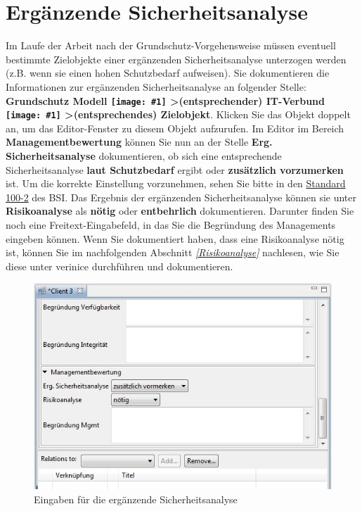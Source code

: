 \documentclass[a4paper,10pt]{book}
\newcommand{\icon}[1]{\texttt{[image: \#1]}}
\begin{document}
\section{Ergänzende Sicherheitsanalyse}
Im Laufe der Arbeit nach der Grundschutz-Vorgehensweise müssen eventuell bestimmte Zielobjekte einer ergänzenden Sicherheitsanalyse unterzogen werden
(z.B. wenn sie einen hohen Schutzbedarf aufweisen). Sie dokumentieren die Informationen zur ergänzenden Sicherheitsanalyse an folgender Stelle:
\textbf{Grundschutz Modell \icon{Icon/GS_Modell.png} \textgreater (entsprechender) IT-Verbund
\icon{Icon/GS_Modell.png} \textgreater (entsprechendes) Zielobjekt}. Klicken Sie das Objekt doppelt an, um das Editor-Fenster zu diesem
Objekt aufzurufen. Im Editor im Bereich \textbf{Managementbewertung} können Sie nun  an der Stelle \textbf{Erg. Sicherheitsanalyse}
dokumentieren, ob sich eine entsprechende Sicherheitsanalyse \textbf{laut Schutzbedarf} ergibt oder \textbf{zusätzlich vorzumerken} ist. Um die korrekte
Einstellung vorzunehmen, sehen Sie bitte in den \href{https://www.bsi.bund.de/DE/Themen/ITGrundschutz/ITGrundschutzStandards/ITGrundschutzStandards_node.html#doc471418bodyText2}{Standard 100-2}
des BSI. Das Ergebnis der ergänzenden Sicherheitsanalyse können sie unter \textbf{Risikoanalyse} als \textbf{nötig} oder \textbf{entbehrlich} dokumentieren.
Darunter finden Sie noch eine Freitext-Eingabefeld, in das Sie die Begründung des Managements eingeben können. Wenn Sie dokumentiert haben, dass eine
Risikoanalyse nötig ist, können Sie im nachfolgenden Abschnitt {\em \ref{Risikoanalyse} } nachlesen, wie Sie diese unter verinice durchführen und dokumentieren.
\newline
\begin{figure}[htb!]
  \centering
  \includegraphics[scale=.6]{Screenshot/Sicherheitsanalyse.jpg}
  \caption{\label{Eingaben fuer die ergaenzende Sicherheitsanalyse} Eingaben für die ergänzende Sicherheitsanalyse}
\end{figure}
\newline
\end{document}
